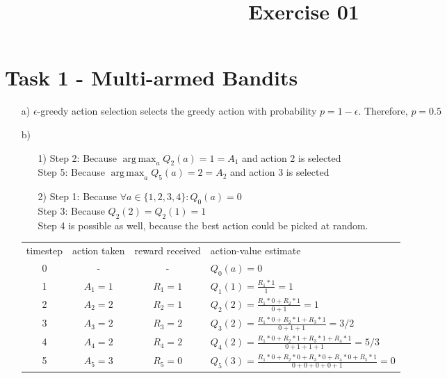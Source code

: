 \documentclass[a4paper]{article}
\date{}
\author{}
\title{\textbf{Exercise 01}}
\DeclareMathOperator*{\argmax}{arg\,max}
\begin{document}
	\maketitle 
	\thispagestyle{fancy}
	
    \section*{Task 1 - Multi-armed Bandits}
    \begin{itemize}
    \item[a)] $\epsilon$-greedy action selection selects the greedy action with probability $p=1-\epsilon$. Therefore, $p=0.5$
    \item[b)]
    	\begin{itemize}
    		\item[1)] Step 2: Because $\argmax_a Q_2(a) = 1 = A_1$ and action 2 is selected \\
    				  Step 5: Because $\argmax_a Q_5(a) = 2 = A_2$ and action 3 is selected \\
    		\item[2)] Step 1: Because $\forall a \in \{1,2,3,4\}: Q_0(a) = 0$ \\
    				  Step 3: Because $Q_2(2)=Q_2(1)=1$ \\
    				  Step 4 is possible as well, because the best action could be picked at random.
    	\end{itemize}
    \vspace{.3in}
    \begin{tabularx}{\linewidth}{c | c | c | l}
    	timestep & action taken & reward received & action-value estimate \\ 
    	0 & - & -  & $Q_0(a) = 0$ \\[2ex]
    	1 & $A_1=1$ & $R_1=1$ & $Q_1(1) = \frac{R_1*1}{1} = 1$ \\[2ex]
    	2 & $A_2=2$ & $R_2=1$ & $Q_2(2) = \frac{R_1*0+R_2*1}{0+1} = 1$ \\[2ex]
    	3 & $A_3=2$ & $R_3=2$ & $Q_3(2) = \frac{R_1*0+R_2*1+R_3*1}{0+1+1} = 3/2$ \\[2ex]
    	4 & $A_4=2$ & $R_4=2$ & $Q_4(2) = \frac{R_1*0+R_2*1+R_3*1+R_4*1}{0+1+1+1} = 5/3$  \\[2ex]
    	5 & $A_5=3$ & $R_5=0$ & $Q_5(3) = \frac{R_1*0+R_2*0+R_3*0+R_4*0+R_5*1}{0+0+0+0+1} = 0$
    \end{tabularx}
    \end{itemize}

    
\end{document}
